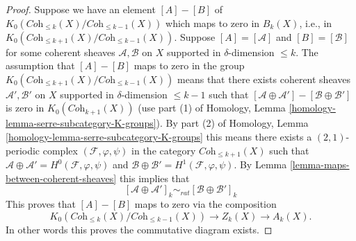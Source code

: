 \begin{proof}
Suppose we have an element $[A] - [B]$ of
$K_0(\textit{Coh}_{\leq k}(X)/\textit{Coh}_{\leq k - 1}(X))$
which maps to zero in $B_k(X)$, i.e., in
$K_0(\textit{Coh}_{\leq k + 1}(X)/\textit{Coh}_{\leq k - 1}(X))$.
Suppose $[A] = [\mathcal{A}]$ and $[B] = [\mathcal{B}]$
for some coherent sheaves $\mathcal{A}, \mathcal{B}$ on
$X$ supported in $\delta$-dimension $\leq k$.
The assumption that $[A] - [B]$ maps to zero in the group
$K_0(\textit{Coh}_{\leq k + 1}(X)/\textit{Coh}_{\leq k - 1}(X))$
means that there exists coherent sheaves
$\mathcal{A}', \mathcal{B}'$ on $X$ supported in
$\delta$-dimension $\leq k - 1$ such that
$[\mathcal{A} \oplus \mathcal{A}'] - [\mathcal{B} \oplus \mathcal{B}']$
is zero in $K_0(\textit{Coh}_{k + 1}(X))$ (use part (1) of
Homology, Lemma \ref{homology-lemma-serre-subcategory-K-groups}).
By part (2) of
Homology, Lemma \ref{homology-lemma-serre-subcategory-K-groups}
this means there exists a $(2, 1)$-periodic complex
$(\mathcal{F}, \varphi, \psi)$ in the category $\textit{Coh}_{\leq k + 1}(X)$
such that
$\mathcal{A} \oplus \mathcal{A}' = H^0(\mathcal{F}, \varphi, \psi)$
and $\mathcal{B} \oplus \mathcal{B}' = H^1(\mathcal{F}, \varphi, \psi)$.
By Lemma \ref{lemma-maps-between-coherent-sheaves}
this implies that
$$
[\mathcal{A} \oplus \mathcal{A}']_k
\sim_{rat}
[\mathcal{B} \oplus \mathcal{B}']_k
$$
This proves that $[A] - [B]$ maps to zero via the composition
$$
K_0(\textit{Coh}_{\leq k}(X)/\textit{Coh}_{\leq k - 1}(X))
\longrightarrow Z_k(X)
\longrightarrow A_k(X).
$$
In other words this proves the
commutative diagram exists.


\end{proof}
